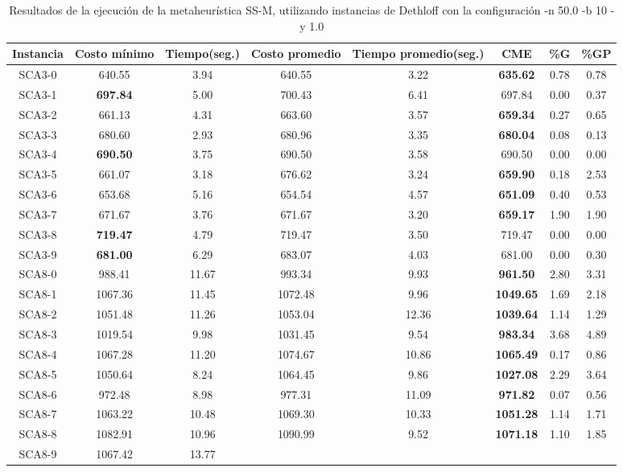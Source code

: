 \begin{table}[h]
\caption{Resultados de la ejecución de la metaheurística SS-M, utilizando instancias de Dethloff con la configuración -n 50.0 -b 10 -y 1.0}
\centering
\small
\begin{tabular}{c c c c c c c c}
\hline\hline
Instancia & Costo mínimo & Tiempo(seg.) & Costo promedio & Tiempo promedio(seg.) & CME & \%G & \%GP \\ [0.5ex]
\hline
SCA3-0 & 640.55 & 3.94 & 
640.55 & 3.22 & \bf{635.62} & 
0.78 & 0.78\\SCA3-1 & \bf{697.84} & 5.00 & 
700.43 & 6.41 & 697.84 & 0.00
 & 0.37\\SCA3-2 & 661.13 & 4.31 & 
663.60 & 3.57 & \bf{659.34} & 
0.27 & 0.65\\SCA3-3 & 680.60 & 2.93 & 
680.96 & 3.35 & \bf{680.04} & 
0.08 & 0.13\\SCA3-4 & \bf{690.50} & 3.75 & 
690.50 & 3.58 & 690.50 & 0.00
 & 0.00\\
SCA3-5 & 661.07 & 3.18 & 
676.62 & 3.24 & \bf{659.90} & 
0.18 & 2.53\\SCA3-6 & 653.68 & 5.16 & 
654.54 & 4.57 & \bf{651.09} & 
0.40 & 0.53\\SCA3-7 & 671.67 & 3.76 & 
671.67 & 3.20 & \bf{659.17} & 
1.90 & 1.90\\SCA3-8 & \bf{719.47} & 4.79 & 
719.47 & 3.50 & 719.47 & 0.00
 & 0.00\\
SCA3-9 & \bf{681.00} & 6.29 & 
683.07 & 4.03 & 681.00 & 0.00
 & 0.30\\SCA8-0 & 988.41 & 11.67 & 
993.34 & 9.93 & \bf{961.50} & 
2.80 & 3.31\\SCA8-1 & 1067.36 & 11.45 & 
1072.48 & 9.96 & \bf{1049.65} & 
1.69 & 2.18\\SCA8-2 & 1051.48 & 11.26 & 
1053.04 & 12.36 & \bf{1039.64} & 
1.14 & 1.29\\SCA8-3 & 1019.54 & 9.98 & 
1031.45 & 9.54 & \bf{983.34} & 
3.68 & 4.89\\SCA8-4 & 1067.28 & 11.20 & 
1074.67 & 10.86 & \bf{1065.49} & 
0.17 & 0.86\\SCA8-5 & 1050.64 & 8.24 & 
1064.45 & 9.86 & \bf{1027.08} & 
2.29 & 3.64\\SCA8-6 & 972.48 & 8.98 & 
977.31 & 11.09 & \bf{971.82} & 
0.07 & 0.56\\SCA8-7 & 1063.22 & 10.48 & 
1069.30 & 10.33 & \bf{1051.28} & 
1.14 & 1.71\\SCA8-8 & 1082.91 & 10.96 & 
1090.99 & 9.52 & \bf{1071.18} & 
1.10 & 1.85\\SCA8-9 & 1067.42 & 13.77 & 

\end{tabular}
\end{table}

